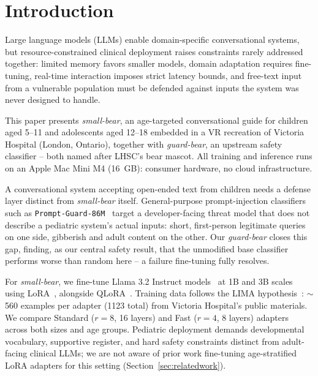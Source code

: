 \documentclass[pdflatex,sn-mathphys-num]{sn-jnl-official}%
\begin{document}

\maketitle

\section{Introduction}\label{sec1}

Large language models (LLMs) enable domain-specific conversational systems, but resource-constrained clinical deployment raises constraints rarely addressed together: limited memory favors smaller models, domain adaptation requires fine-tuning, real-time interaction imposes strict latency bounds, and free-text input from a vulnerable population must be defended against inputs the system was never designed to handle.

This paper presents \textit{small-bear}, an age-targeted conversational guide for children aged 5--11 and adolescents aged 12--18 embedded in a VR recreation of Victoria Hospital (London, Ontario), together with \textit{guard-bear}, an upstream safety classifier -- both named after LHSC's bear mascot. All training and inference runs on an Apple Mac Mini M4 (16~GB): consumer hardware, no cloud infrastructure.

A conversational system accepting open-ended text from children needs a defense layer distinct from \textit{small-bear} itself. General-purpose prompt-injection classifiers such as \texttt{Prompt-Guard-86M}~\cite{promptguard2024} target a developer-facing threat model that does not describe a pediatric system's actual inputs: short, first-person legitimate queries on one side, gibberish and adult content on the other. Our \textit{guard-bear} closes this gap, finding, as our central safety result, that the unmodified base classifier performs worse than random here -- a failure fine-tuning fully resolves.

For \textit{small-bear}, we fine-tune Llama 3.2 Instruct models~\cite{dubey2024llama3} at 1B and 3B scales using LoRA~\cite{hu2022lora}, alongside QLoRA~\cite{dettmers2023qlora}. Training data follows the LIMA hypothesis~\cite{zhou2023lima}: $\sim$560 examples per adapter (1123 total) from Victoria Hospital's public materials. We compare Standard ($r=8$, 16 layers) and Fast ($r=4$, 8 layers) adapters across both sizes and age groups. Pediatric deployment demands developmental vocabulary, supportive register, and hard safety constraints distinct from adult-facing clinical LLMs; we are not aware of prior work fine-tuning age-stratified LoRA adapters for this setting (Section~\ref{sec:relatedwork}).
\end{document}
